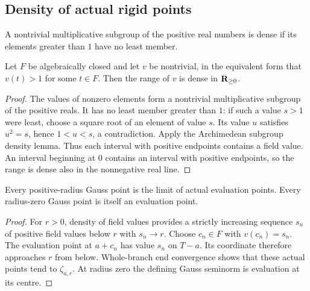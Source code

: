 \subsection{Density of actual rigid points}\label{subsec:fc-line-rigid-density}

\begin{lemma}\label{lem:fc-archimedean-subgroup-density}
\mathlibok
A nontrivial multiplicative subgroup of the positive real numbers is dense
if its elements greater than $1$ have no least member.
\end{lemma}

\begin{lemma}\label{lem:fc-value-range-dense}
\leanok
{}
Let $F$ be algebraically closed and let $v$ be nontrivial, in the equivalent
form that $v(t)>1$ for some $t\in F$. Then the range of $v$ is dense in
$\mathbf{R}_{\ge0}$.
\end{lemma}

\begin{proof}
The values of nonzero elements form a nontrivial multiplicative subgroup
of the positive reals. It has no least member greater than $1$: if such
a value $s>1$ were least, choose a square root of an element of value $s$.
Its value $u$ satisfies $u^2=s$, hence $1<u<s$, a contradiction.
Apply the Archimedean subgroup density lemma. Thus each interval with
positive endpoints contains a field value. An interval beginning at $0$ contains
an interval with positive endpoints, so the range is dense also in the
nonnegative real line.
\end{proof}

\begin{lemma}\label{lem:fc-gauss-rigid-approximation}
\leanok
{}
Every positive-radius Gauss point is the limit of actual evaluation points.
Every radius-zero Gauss point is itself an evaluation point.
\end{lemma}

\begin{proof}
For $r>0$, density of field values provides a strictly increasing sequence
$s_n$ of positive field values below $r$ with $s_n\to r$. Choose $c_n\in F$
with $v(c_n)=s_n$. The evaluation point at $a+c_n$ has value $s_n$ on
$T-a$. Its coordinate therefore approaches $r$ from below. Whole-branch
end convergence shows that these actual points tend to $\zeta_{a,r}$.
At radius zero the defining Gauss seminorm is evaluation at its centre.
\end{proof}

